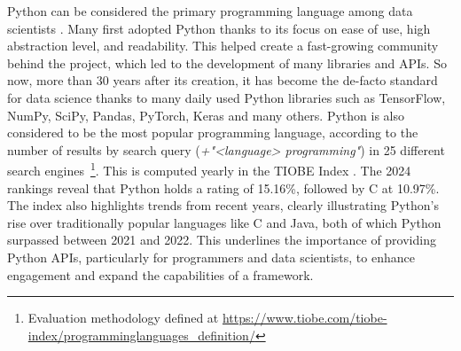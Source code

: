 Python can be considered the primary programming language among data scientists \cite{Python_CS-R9526}. Many first adopted Python thanks to its focus on ease of use, high abstraction level, and readability. This helped create a fast-growing community behind the project, which led to the development of many libraries and \glspl{API}. So now, more than 30 years after its creation, it has become the de-facto standard for data science thanks to many daily used Python libraries such as TensorFlow, NumPy, SciPy, Pandas, PyTorch, Keras and many others. Python is also considered to be the most popular programming language, according to the number of results by search query (\textit{+"<language> programming"}) in 25 different search engines~\footnote{Evaluation methodology defined at \url{https://www.tiobe.com/tiobe-
index/programminglanguages_definition/}}. This is computed yearly in the TIOBE Index \cite{TIOBEIndex}. The 2024 rankings reveal that Python holds a rating of 15.16\%, followed by C at 10.97\%. The index also highlights trends from recent years, clearly illustrating Python's rise over traditionally popular languages like C and Java, both of which Python surpassed between 2021 and 2022. This underlines the importance of providing Python APIs, particularly for programmers and data scientists, to enhance engagement and expand the capabilities of a framework.